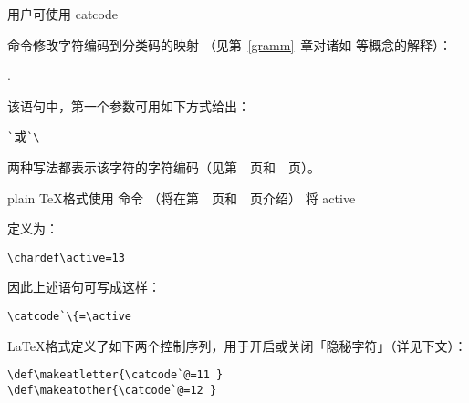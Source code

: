 \documentclass{book}
\begin{document}
用户可使用 \csterm catcode\par 命令修改字符编码到分类码的映射%
（见第~\ref{gramm}~章对诸如  等概念的解释）：
\begin{disp}.\end{disp}
该语句中，第一个参数可用如下方式给出：
\begin{disp}\verb>`>\quad 或\quad \verb>`\>\end{disp}
两种写法都表示该字符的字符编码（见第~\pageref{char:code}~页和~\pageref{int:denotation}~页）。

plain \TeX 格式使用  命令%
（将在第~\pageref{chardef}~页和~\pageref{num:chardef}~页介绍）%
将 \csterm active\par 定义为：
\begin{verbatim}
\chardef\active=13
\end{verbatim}
因此上述语句可写成这样：
\begin{verbatim}
\catcode`\{=\active
\end{verbatim}

\LaTeX 格式定义了如下两个控制序列，用于开启或关闭「隐秘字符」（详见下文）：
\begin{verbatim}
\def\makeatletter{\catcode`@=11 }
\def\makeatother{\catcode`@=12 }
\end{verbatim}
\end{document}
